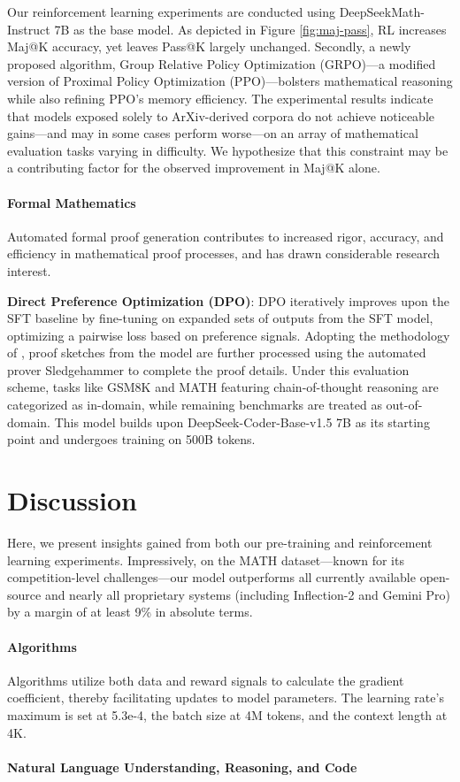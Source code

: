 {Our reinforcement learning experiments are conducted using DeepSeekMath-Instruct 7B as the base model. As depicted in Figure \ref{fig:maj-pass}, RL increases Maj@K accuracy, yet leaves Pass@K largely unchanged. Secondly, a newly proposed algorithm, Group Relative Policy Optimization (GRPO)—a modified version of Proximal Policy Optimization (PPO)—bolsters mathematical reasoning while also refining PPO's memory efficiency. The experimental results indicate that models exposed solely to ArXiv-derived corpora do not achieve noticeable gains—and may in some cases perform worse—on an array of mathematical evaluation tasks varying in difficulty. We hypothesize that this constraint may be a contributing factor for the observed improvement in Maj@K alone. \paragraph{Formal Mathematics}

Automated formal proof generation contributes to increased rigor, accuracy, and efficiency in mathematical proof processes, and has drawn considerable research interest. \item \textbf{Direct Preference Optimization (DPO)}: DPO iteratively improves upon the SFT baseline by fine-tuning on expanded sets of outputs from the SFT model, optimizing a pairwise loss based on preference signals. Adopting the methodology of \cite{dsp_proof}, proof sketches from the model are further processed using the automated prover Sledgehammer \citep{sledgehammer} to complete the proof details. Under this evaluation scheme, tasks like GSM8K and MATH featuring chain-of-thought reasoning are categorized as in-domain, while remaining benchmarks are treated as out-of-domain. This model builds upon DeepSeek-Coder-Base-v1.5 7B \citep{deepseek-coder} as its starting point and undergoes training on 500B tokens. \section{Discussion}
Here, we present insights gained from both our pre-training and reinforcement learning experiments. Impressively, on the MATH dataset—known for its competition-level challenges—our model outperforms all currently available open-source and nearly all proprietary systems (including Inflection-2 and Gemini Pro) by a margin of at least 9\% in absolute terms. \paragraph{Algorithms} Algorithms utilize both data and reward signals to calculate the gradient coefficient, thereby facilitating updates to model parameters. The learning rate’s maximum is set at 5.3e-4, the batch size at 4M tokens, and the context length at 4K.  \paragraph{Natural Language Understanding, Reasoning, and Code}

}
